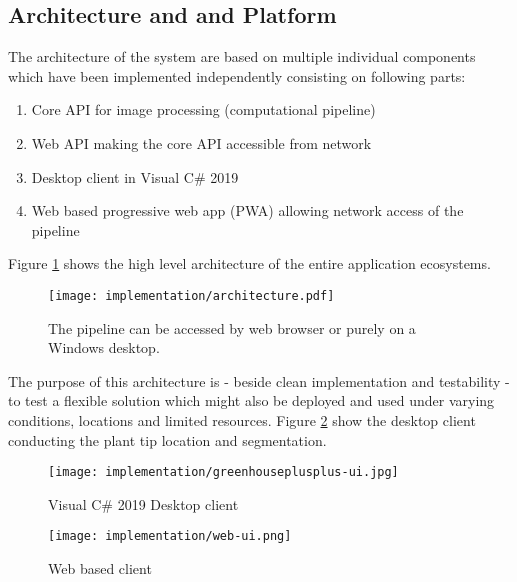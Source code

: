 \subsection{Architecture and and Platform}\label{sec:architecture}

The architecture of the system are based on multiple individual components which have been implemented
independently consisting on following parts:

\begin{enumerate}
    \item Core API for image processing (computational pipeline) \cite{greenhouseplusplus}
    \item Web API making the core API accessible from network \cite{greenhouseplusplus}
    \item Desktop client in Visual C\# 2019 \cite{greenhouseplusplus}
    \item Web based progressive web app (PWA) allowing network access of the pipeline \cite{greenhouseplusplus:app}
\end{enumerate}

Figure \ref{fig:arch} shows the high level architecture of the entire application ecosystems.

\begin{figure}[H]
    \centering
    \texttt{[image: implementation/architecture.pdf]}
    \caption{The pipeline can be accessed by web browser or purely on a Windows desktop.}
    \label{fig:arch}
\end{figure}

The purpose of this architecture is - beside clean implementation and testability - to test a flexible
solution which might also be deployed and used under varying conditions, locations and limited resources.
Figure \ref{fig:desktopclient} show the desktop client conducting the plant tip location and segmentation.

\begin{figure}[H]
    \centering
    \texttt{[image: implementation/greenhouseplusplus-ui.jpg]}
    \caption{Visual C\# 2019 Desktop client}
    \label{fig:desktopclient}
\end{figure}

\begin{figure}[H]
    \centering
    \texttt{[image: implementation/web-ui.png]}
    \caption{Web based client}
    \label{fig:webclient}
\end{figure}